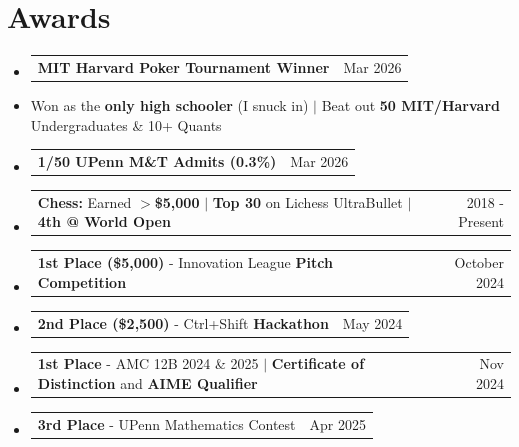 \documentclass[letterpaper,11pt]{article}
\makeatletter
\newcommand{\resumeItem}[1]{
  \item\small{
    {#1 \vspace{-2pt}}
  }
}
\newcommand{\resumeProjectHeading}[2]{
    \item
    \begin{tabular*}{0.97\textwidth}{l@{\extracolsep{\fill}}r}
      \normalsize#1 & #2 \\
    \end{tabular*}\vspace{-7pt}
}
\newcommand{\resumeSubHeadingListStart}{\begin{itemize}[leftmargin=0.15in, label={}]}
\newcommand{\resumeSubHeadingListEnd}{\end{itemize}}
\makeatother
\begin{document}
\section{Awards}
    \resumeSubHeadingListStart 
      \resumeProjectHeading
          {\textbf{MIT Harvard Poker Tournament Winner}}{Mar 2026}
          \resumeItem{Won as the \textbf{only high schooler} (I snuck in) $|$ Beat out \textbf{50 MIT/Harvard} Undergraduates \& 10+ Quants}
      \resumeProjectHeading
          {\textbf{1/50 UPenn M\&T Admits (0.3\%)}}{Mar 2026}
      \resumeProjectHeading
          {\textbf{Chess:} Earned \textbf{$>$\$5,000} $|$ \textbf{Top 30} on Lichess UltraBullet $|$  \textbf{4th @ World Open}}{2018 - Present}
      \resumeProjectHeading
          {\textbf{1st Place (\$5,000)} - Innovation League \textbf{Pitch Competition} }{October 2024}
      \resumeProjectHeading
          {\textbf{2nd Place (\$2,500)} - Ctrl+Shift \textbf{Hackathon} }{May 2024}
      \resumeProjectHeading
          {\textbf{1st Place} - AMC 12B 2024 \& 2025 $|$ \textbf{Certificate of Distinction} and \textbf{AIME Qualifier}}{Nov 2024}
      \resumeProjectHeading
          {\textbf{3rd Place} - UPenn Mathematics Contest}{Apr 2025}

    \resumeSubHeadingListEnd
\end{document}
